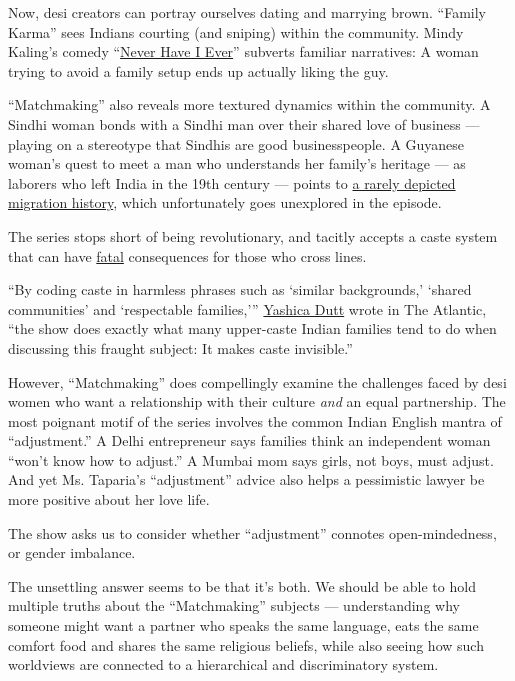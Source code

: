 Now, desi creators can portray ourselves dating and marrying brown.
``Family Karma'' sees Indians courting (and sniping) within the
community. Mindy Kaling's comedy
``\href{https://www.nytimes.com/2020/04/27/arts/television/never-have-i-ever-normal-people.html}{Never
Have I Ever}'' subverts familiar narratives: A woman trying to avoid a
family setup ends up actually liking the guy.

``Matchmaking'' also reveals more textured dynamics within the
community. A Sindhi woman bonds with a Sindhi man over their shared love
of business --- playing on a stereotype that Sindhis are good
businesspeople. A Guyanese woman's quest to meet a man who understands
her family's heritage --- as laborers who left India in the 19th century
--- points to
\href{https://press.uchicago.edu/ucp/books/book/chicago/C/bo13393932.html}{a
rarely depicted migration history}, which unfortunately goes unexplored
in the episode.

The series stops short of being revolutionary, and tacitly accepts a
caste system that can have
\href{https://www.nytimes.com/2010/07/10/world/asia/10honor.html}{fatal}
consequences for those who cross lines.

``By coding caste in harmless phrases such as `similar backgrounds,'
`shared communities' and `respectable families,'''
\href{https://www.theatlantic.com/culture/archive/2020/08/netflix-indian-matchmaking-and-the-shadow-of-caste/614863/}{Yashica
Dutt} wrote in The Atlantic, ``the show does exactly what many
upper-caste Indian families tend to do when discussing this fraught
subject: It makes caste invisible.''

However, ``Matchmaking'' does compellingly examine the challenges faced
by desi women who want a relationship with their culture \emph{and} an
equal partnership. The most poignant motif of the series involves the
common Indian English mantra of ``adjustment.'' A Delhi entrepreneur
says families think an independent woman ``won't know how to adjust.'' A
Mumbai mom says girls, not boys, must adjust. And yet Ms. Taparia's
``adjustment'' advice also helps a pessimistic lawyer be more positive
about her love life.

The show asks us to consider whether ``adjustment'' connotes
open-mindedness, or gender imbalance.

The unsettling answer seems to be that it's both. We should be able to
hold multiple truths about the ``Matchmaking'' subjects ---
understanding why someone might want a partner who speaks the same
language, eats the same comfort food and shares the same religious
beliefs, while also seeing how such worldviews are connected to a
hierarchical and discriminatory system.

